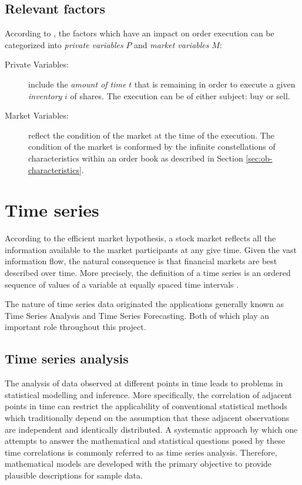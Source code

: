\subsection{Relevant factors}

According to \cite{nevmyvaka2006reinforcement}, the factors which have an impact on order execution can be categorized into \textit{private variables} $P$ and \textit{market variables} $M$:
\begin{description}
    \item[Private Variables:] include the \textit{amount of time} $t$ that is remaining in order to execute a given \textit{inventory} $i$ of shares.
    The execution can be of either subject: buy or sell.
    \item[Market Variables:] reflect the condition of the market at the time of the execution.
    The condition of the market is conformed by the infinite constellations of characteristics  within an order book as described in Section \ref{sec:ob-characteristics}.
    
\end{description}


\section{Time series}

According to the efficient market hypothesis\cite{malkiel1989efficient}, a stock market reflects all the information available to the market participants at any give time. 
Given the vast information flow, the natural consequence is that financial markets are best described over time. 
More precisely, the definition of a time series is an ordered sequence of values of a variable at equally spaced time intervals \cite{intro-timeseries}.

The nature of time series data originated the applications generally known as Time Series Analysis and Time Series Forecasting. 
Both of which play an important role throughout this project.

\subsection{Time series analysis}

The analysis of data observed at different points in time leads to problems in statistical modelling and inference. 
More specifically, the correlation of adjacent points in time can restrict the applicability of conventional statistical methods which traditionally depend on the assumption that these adjacent observations are independent and identically distributed. 
A systematic approach by which one attempts to answer the mathematical and statistical questions posed by these time correlations is commonly referred to as time series analysis. 
Therefore, mathematical models are developed with the primary objective to provide plausible descriptions for sample data. \cite{shumway2000time}

